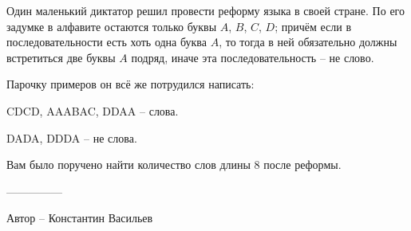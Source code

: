 \question
Один маленький диктатор решил провести реформу языка в своей стране. По его задумке в алфавите остаются только буквы $A$, $B$, $C$, $D$; причём если в последовательности есть хоть одна буква $A$, то тогда в ней обязательно должны встретиться две буквы $A$ подряд, иначе эта последовательность -- не слово.

Парочку примеров он всё же потрудился написать:

CDCD, AAABAC, DDAA -- слова.

DADA, DDDA -- не слова.

Вам было поручено найти количество слов длины 8 после реформы.

---------------

Автор -- Константин Васильев
